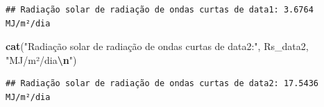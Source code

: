 \documentclass[
]{article}
\newenvironment{Shaded}{\begin{snugshade}}{\end{snugshade}}
\newcommand{\CommentTok}[1]{\textcolor[rgb]{0.56,0.35,0.01}{\textit{#1}}}
\newcommand{\DocumentationTok}[1]{\textcolor[rgb]{0.56,0.35,0.01}{\textbf{\textit{#1}}}}
\newcommand{\FloatTok}[1]{\textcolor[rgb]{0.00,0.00,0.81}{#1}}
\newcommand{\FunctionTok}[1]{\textcolor[rgb]{0.13,0.29,0.53}{\textbf{#1}}}
\newcommand{\NormalTok}[1]{#1}
\newcommand{\OtherTok}[1]{\textcolor[rgb]{0.56,0.35,0.01}{#1}}
\newcommand{\SpecialCharTok}[1]{\textcolor[rgb]{0.81,0.36,0.00}{\textbf{#1}}}
\newcommand{\StringTok}[1]{\textcolor[rgb]{0.31,0.60,0.02}{#1}}
\begin{document}
\begin{verbatim}
## Radiação solar de radiação de ondas curtas de data1: 3.6764 MJ/m²/dia
\end{verbatim}

\begin{Shaded}
\begin{Highlighting}[]
\FunctionTok{cat}\NormalTok{(}\StringTok{"Radiação solar de radiação de ondas curtas de data2:"}\NormalTok{, Rs\_data2, }\StringTok{"MJ/m²/dia}\SpecialCharTok{\textbackslash{}n}\StringTok{"}\NormalTok{)}
\end{Highlighting}
\end{Shaded}

\begin{verbatim}
## Radiação solar de radiação de ondas curtas de data2: 17.5436 MJ/m²/dia
\end{verbatim}

\begin{Shaded}
\end{Shaded}
\end{document}
